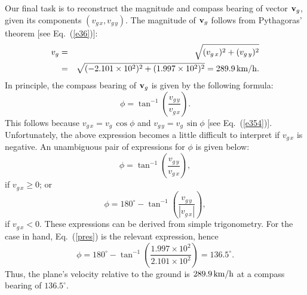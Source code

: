 Our final task is to reconstruct the magnitude and compass bearing of vector ${\bf v}_g$,
given its components $(v_{g\,x}, v_{g\,y})$. The magnitude of ${\bf v}_g$ follows
from Pythagoras' theorem [see Eq.~(\ref{e36})]:
\begin{eqnarray}
v_g &=& \sqrt{(v_{g\,x})^2 + (v_{g\,y})^2}\nonumber \\
&=& \sqrt{(-2.101\times 10^2)^2 + (1.997\times 10^2)^2} = 289.9\,{\rm km/h}.
\end{eqnarray}
In principle, the compass bearing of ${\bf v}_g$ is given
by the following formula:
\begin{equation}
\phi = \tan^{-1} \left(\frac{v_{g\,y}}{v_{g\,x}}\right).
\end{equation}
This follows because $v_{g\,x}=v_g\,\cos\phi$ and $v_{g\,y}=v_g\,\sin\phi$ [see
Eq.~(\ref{e354})].
Unfortunately, the above expression becomes a little difficult to interpret
if $v_{g\,x}$ is negative. An unambiguous
pair of expressions for $\phi$ is given below:
\begin{equation}
\phi = \tan^{-1} \left(\frac{v_{g\,y}}{v_{g\,x}}\right),
\end{equation}
if $v_{g\,x}\geq 0$; or
\begin{equation}\label{pres}
\phi = 180^\circ - \tan^{-1} \left(\frac{v_{g\,y}}{|v_{g\,x}|}\right),
\end{equation}
if $v_{g\,x}< 0$.
These expressions can  be derived from simple
trigonometry.
 For the case in hand, Eq.~(\ref{pres}) is the
relevant expression, hence
\begin{equation}
\phi = 180^\circ - \tan^{-1} \left(\frac{1.997\times 10^2}{2.101\times 10^2}\right)
= 136.5^\circ.
\end{equation}
Thus, the plane's velocity relative to the ground is $289.9\,{\rm km/h}$ at a compass
bearing of $136.5^\circ$.

